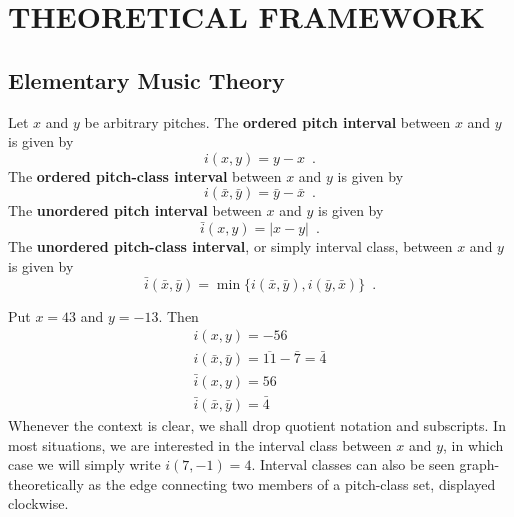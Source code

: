 \chapter{THEORETICAL FRAMEWORK}

\section{Elementary Music Theory}


\begin{definition}
	Let $x$ and $y$ be arbitrary pitches. The \textbf{ordered pitch interval} between
	$x$ and $y$ is given by
	\begin{equation}
		i(x, y) = y - x \enspace.
	\end{equation}
	The \textbf{ordered pitch-class interval} between $x$ and $y$ is given by
	\begin{equation}
		i(\bar{x}, \bar{y}) = \bar{y} - \bar{x} \enspace.
	\end{equation}
	The \textbf{unordered pitch interval} between $x$ and $y$ is given by
	\begin{equation}
		\bar{i}(x, y) = |x - y| \enspace.
	\end{equation}
	The \textbf{unordered pitch-class interval}, or simply interval class, between
	$x$ and $y$ is given by
	\begin{equation}
		\bar{i}(\bar{x}, \bar{y}) = \min\{i(\bar{x}, \bar{y}), i(\bar{y}, \bar{x})\} \enspace.
	\end{equation}
\end{definition}

\begin{example}
	Put $x = 43$ and $y = -13$. Then
	\begin{gather}
		i(x, y) = -56 \\
		i(\bar{x}, \bar{y}) = \overline{11} - \bar{7} = \bar{4} \\
		\bar{i}(x, y) = 56 \\
		\bar{i}(\bar{x}, \bar{y}) = \bar{4}
	\end{gather}
	Whenever the context is clear, we shall drop quotient notation and subscripts.
	In most situations, we are interested in the interval class between $x$ and $y$,
	in which case we will simply write $i(7, -1) = 4$. Interval classes can also be
	seen graph-theoretically as the edge connecting two members of a pitch-class set,
	displayed clockwise.
\end{example}


